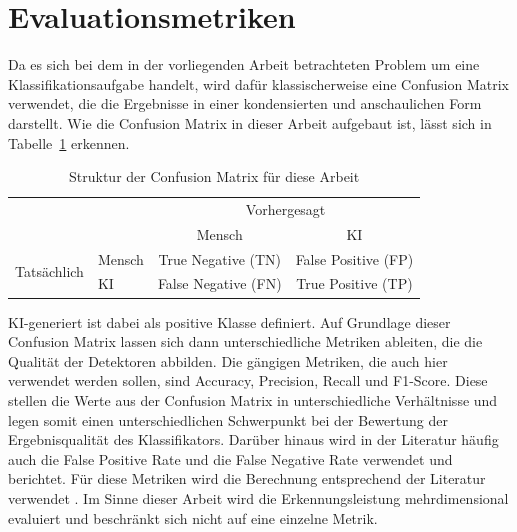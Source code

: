 \section{Evaluationsmetriken}
\label{sec:metrics}
Da es sich bei dem in der vorliegenden Arbeit betrachteten Problem um eine Klassifikationsaufgabe handelt, wird dafür klassischerweise eine Confusion Matrix verwendet, die die Ergebnisse in einer kondensierten und anschaulichen Form darstellt. Wie die Confusion Matrix in dieser Arbeit aufgebaut ist, lässt sich in Tabelle~\ref{tab:cm_structure} erkennen.
\begin{table}[htbp]
  \caption{Struktur der Confusion Matrix für diese Arbeit}
  \label{tab:cm_structure}
  \centering
  \begin{tabular}{ll cc}
    \toprule
                                 &        & \multicolumn{2}{c}{Vorhergesagt}                       \\
                                 &        & Mensch                           & KI                  \\
    \midrule
    \multirow{2}{*}{Tatsächlich} & Mensch & True Negative (TN)               & False Positive (FP) \\
                                 & KI     & False Negative (FN)              & True Positive (TP)  \\
    \bottomrule
  \end{tabular}
\end{table}
KI-generiert ist dabei als positive Klasse definiert.
Auf Grundlage dieser Confusion Matrix lassen sich dann unterschiedliche Metriken ableiten, die die Qualität der Detektoren abbilden. Die gängigen Metriken, die auch hier verwendet werden sollen, sind Accuracy, Precision, Recall und F1-Score. Diese stellen die Werte aus der Confusion Matrix in unterschiedliche Verhältnisse und legen somit einen unterschiedlichen Schwerpunkt bei der Bewertung der Ergebnisqualität des Klassifikators. Darüber hinaus wird in der Literatur häufig auch die False Positive Rate und die False Negative Rate verwendet und berichtet. Für diese Metriken wird die Berechnung entsprechend der Literatur verwendet \autocite{Tharwat2021}. Im Sinne dieser Arbeit wird die Erkennungsleistung mehrdimensional evaluiert und beschränkt sich nicht auf eine einzelne Metrik.


